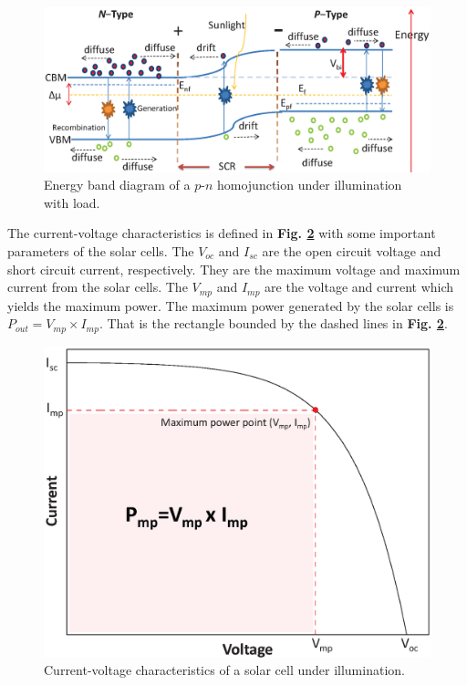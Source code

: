 \documentclass[a4paper, 12pt, titlepage,oneside,drop]{kthesis}
\begin{document}
\begin{figure}[H]
\centering
\includegraphics[scale=0.5]{illumination1.eps}
\caption{Energy band diagram of a $p$-$n$ homojunction under illumination with load.}
\label{illu1}
\end{figure}


The current-voltage characteristics is defined in \textbf{Fig. \ref{ivcharac}} with some important parameters of the solar cells. The $V_{oc}$ and $I_{sc}$ are the open circuit voltage and short circuit current, respectively. 
They are the maximum voltage and maximum current from the solar cells. The $V_{mp}$ and $I_{mp}$ are the voltage and current which yields the maximum power. The maximum power generated by the solar cells
is $P_{out}=V_{mp} \times I_{mp}$. That is the rectangle bounded by the dashed lines in \textbf{Fig. \ref{ivcharac}}. 

\begin{figure}[H]
\centering
\includegraphics[scale=0.5]{IV.eps}
\caption{Current-voltage characteristics of a solar cell under illumination.}
\label{ivcharac}
\end{figure}
\end{document}
